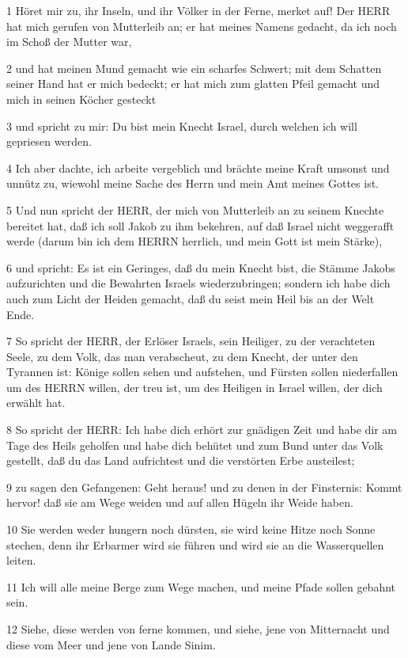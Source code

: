 \par 1 Höret mir zu, ihr Inseln, und ihr Völker in der Ferne, merket auf! Der HERR hat mich gerufen von Mutterleib an; er hat meines Namens gedacht, da ich noch im Schoß der Mutter war,
\par 2 und hat meinen Mund gemacht wie ein scharfes Schwert; mit dem Schatten seiner Hand hat er mich bedeckt; er hat mich zum glatten Pfeil gemacht und mich in seinen Köcher gesteckt
\par 3 und spricht zu mir: Du bist mein Knecht Israel, durch welchen ich will gepriesen werden.
\par 4 Ich aber dachte, ich arbeite vergeblich und brächte meine Kraft umsonst und unnütz zu, wiewohl meine Sache des Herrn und mein Amt meines Gottes ist.
\par 5 Und nun spricht der HERR, der mich von Mutterleib an zu seinem Knechte bereitet hat, daß ich soll Jakob zu ihm bekehren, auf daß Israel nicht weggerafft werde (darum bin ich dem HERRN herrlich, und mein Gott ist mein Stärke),
\par 6 und spricht: Es ist ein Geringes, daß du mein Knecht bist, die Stämme Jakobs aufzurichten und die Bewahrten Israels wiederzubringen; sondern ich habe dich auch zum Licht der Heiden gemacht, daß du seist mein Heil bis an der Welt Ende.
\par 7 So spricht der HERR, der Erlöser Israels, sein Heiliger, zu der verachteten Seele, zu dem Volk, das man verabscheut, zu dem Knecht, der unter den Tyrannen ist: Könige sollen sehen und aufstehen, und Fürsten sollen niederfallen um des HERRN willen, der treu ist, um des Heiligen in Israel willen, der dich erwählt hat.
\par 8 So spricht der HERR: Ich habe dich erhört zur gnädigen Zeit und habe dir am Tage des Heils geholfen und habe dich behütet und zum Bund unter das Volk gestellt, daß du das Land aufrichtest und die verstörten Erbe austeilest;
\par 9 zu sagen den Gefangenen: Geht heraus! und zu denen in der Finsternis: Kommt hervor! daß sie am Wege weiden und auf allen Hügeln ihr Weide haben.
\par 10 Sie werden weder hungern noch dürsten, sie wird keine Hitze noch Sonne stechen, denn ihr Erbarmer wird sie führen und wird sie an die Wasserquellen leiten.
\par 11 Ich will alle meine Berge zum Wege machen, und meine Pfade sollen gebahnt sein.
\par 12 Siehe, diese werden von ferne kommen, und siehe, jene von Mitternacht und diese vom Meer und jene von Lande Sinim.
